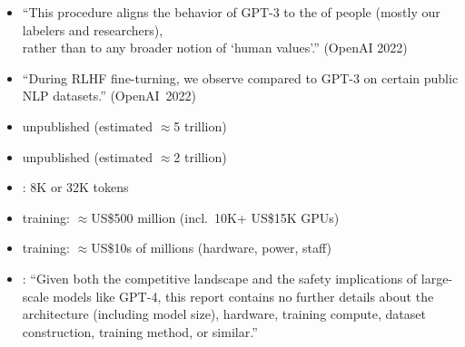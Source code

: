 \documentclass[9pt]{report}
\begin{document}
{
\begin{itemize}
\item 
{\LARGE ``\null}This procedure aligns the behavior of GPT-3 to the  of people (mostly our labelers and researchers),\\[4pt] rather
than to any broader notion of `human values'.{\LARGE \null''} \hfill {\small (OpenAI 2022)}
\vfill
\item {\LARGE ``\null}During RLHF fine-turning, we observe  compared to GPT-3 on certain public NLP
  datasets.{\LARGE\null''}
  \hfill {\small (OpenAI~2022)}
\end{itemize}

\begin{itemize}
\item {} unpublished (estimated $\approx$5 trillion)
\item {} unpublished (estimated $\approx$2
  trillion)
\item {}: 8K or 32K tokens
\item {} training: $\approx$US\$500 million
  (incl.\ 10K+ US\$15K GPUs)
\item {} training: $\approx$US\$10s of
  millions (hardware, power, staff)
  \vfill
\item {}: {\small ``Given both
the competitive landscape and the safety implications of large-scale models like GPT-4, this report
contains no further details about the architecture (including model size), hardware, training compute,
dataset construction, training method, or similar.''}
\end{itemize}

}
\end{document}
